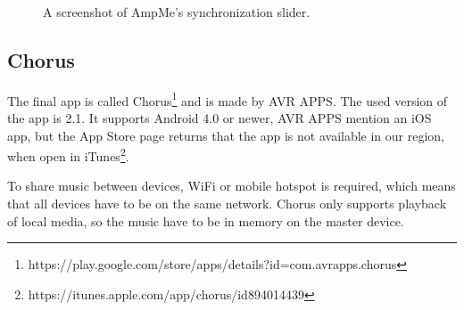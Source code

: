 \begin{figure}[h!]
\begin{minipage}[b]{0.45\textwidth}
        \caption{A screenshot of AmpMe's synchronization slider.}\label{fig:ampme_slider}
    \end{minipage}
\end{figure}

\subsection{Chorus}\label{subsec:chorus}
The final app is called Chorus\footnote{https://play.google.com/store/apps/details?id=com.avrapps.chorus} and is made by AVR APPS.
The used version of the app is 2.1.
It supports Android 4.0 or newer, AVR APPS mention an iOS app, but the App Store page returns that the app is not available in our region,
when open in iTunes\footnote{https://itunes.apple.com/app/chorus/id894014439}.

To share music between devices, WiFi or mobile hotspot is required,
which means that all devices have to be on the same network.
Chorus only supports playback of local media, so the music have to be in memory on the master device.

